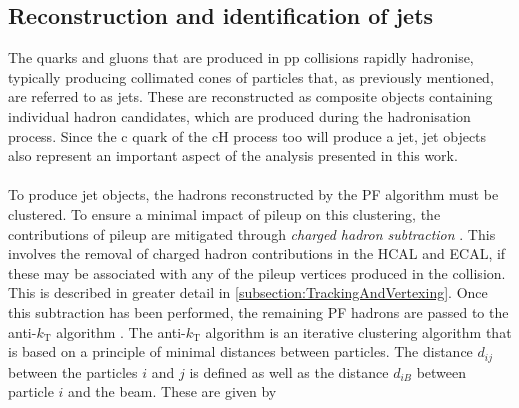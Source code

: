 \subsection{Reconstruction and identification of jets}
The quarks and gluons that are produced in pp collisions rapidly hadronise, typically producing collimated cones of particles that, as previously mentioned, are referred to as jets. These are reconstructed as composite objects containing individual hadron candidates, which are produced during the hadronisation process. Since the c quark of the cH process too will produce a jet, jet objects also represent an important aspect of the analysis presented in this work. \\
\\
To produce jet objects, the hadrons reconstructed by the PF algorithm must be clustered. To ensure a minimal impact of pileup on this clustering, the contributions of pileup are mitigated through \textit{charged hadron subtraction} \cite{ParticleFlowCMS}. This involves the removal of charged hadron contributions in the HCAL and ECAL, if these may be associated with any of the pileup vertices produced in the collision. This is described in greater detail in \autoref{subsection:TrackingAndVertexing}. Once this subtraction has been performed, the remaining PF hadrons are passed to the anti-$k_\mathrm{T}$ algorithm \cite{FastJet}. The anti-$k_\mathrm{T}$ algorithm is an iterative clustering algorithm that is based on a principle of minimal distances between particles. The distance $d_{ij}$ between the particles $i$ and $j$ is defined as well as the distance $d_{iB}$ between particle $i$ and the beam. These are given by 

